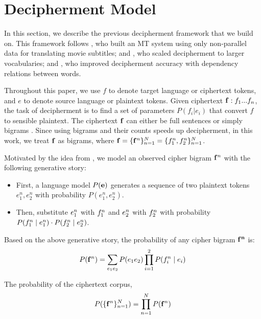 \section{Decipherment Model}

In this section, we describe the previous decipherment framework that we build on.  This framework follows , who built an MT system using only non-parallel data for translating movie subtitles;  and , who scaled decipherment to larger vocabularies; and , who improved decipherment accuracy with dependency relations between words. 

Throughout this paper, we use $f$ to denote target language or ciphertext tokens, and $e$ to denote source language or plaintext tokens. Given ciphertext $\mathbf{f}:f_{1}...f_{n}$, the task of decipherment is to find a set of parameters $P(f_{i}|e_{i})$ that convert $f$ to sensible plaintext. The ciphertext $\mathbf{f}$ can either be full sentences \cite{ravi-knight:2011,Nuhn:2012} or simply bigrams \cite{dou-knight:2013:EMNLP}. Since using bigrams and their counts speeds up decipherment, in this work, we treat $\mathbf{f}$ as bigrams, where $ \mathbf{f} = \{ \mathbf{f}^n \}_{n=1}^{N} = \{ f_1^n,f_2^n \}_{n=1}^{N} $. 

Motivated by the idea from , we model an observed cipher bigram $\mathbf{f}^n$ with the following generative story:

\begin{itemize}
\item  First, a language model $P(\mathbf{e})$ generates a sequence of two plaintext tokens $e_{1}^n,e_{2}^n$ with probability $P(e_{1}^n,e_{2}^n)$.
\item  Then, substitute $e_{1}^n$ with $f_{1}^n$ and $e_{2}^n$ with $f_{2}^n$ with probability $P(f_{1}^n \mid e_{1}^n) \cdot P(f_{2}^n \mid e_{2}^n)$.
\end{itemize}

Based on the above generative story, the probability of any cipher bigram $\mathbf{f^n}$ is:
%
\[
\label{p_cipher}
P(\mathbf{f}^n) =  \sum_{e_{1} e_{2}} P(e_{1}e_{2}) \prod_{i=1}^{2}P(f_{i}^n \mid e_{i})
\]
%

The probability of the ciphertext corpus,
%
\[
\label{p_corpus}
P( \{ \mathbf{f}^n \}_{n=1}^{N} ) =  \prod_{n=1}^{N} P(\mathbf{f}^{n})
\]
%

